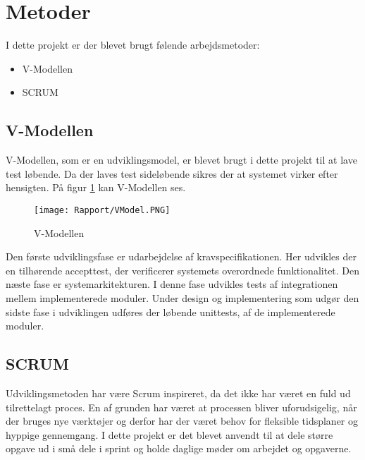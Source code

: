 \section{Metoder}

I dette projekt er der blevet brugt følende arbejdsmetoder:
\begin{itemize}
	\item V-Modellen
	\item SCRUM
	
\end{itemize}

\subsection{V-Modellen}

V-Modellen, som er en udviklingsmodel, er blevet brugt i dette projekt til at lave test løbende. Da der laves test sideløbende sikres der at systemet virker efter hensigten. På figur \ref{VModel} kan V-Modellen ses.

\begin{figure}[H]
	\centering
	\texttt{[image: Rapport/VModel.PNG]}
	\caption{V-Modellen}
	\label{VModel}
\end{figure} 
Den første udviklingsfase er udarbejdelse af kravspecifikationen. Her udvikles der en tilhørende accepttest, der verificerer systemets overordnede funktionalitet. Den næste fase er systemarkitekturen.
I denne fase udvikles tests af integrationen mellem implementerede moduler. Under design og implementering som udgør den sidste fase i udviklingen udføres der løbende unittests, af de implementerede moduler.

\subsection{SCRUM}
Udviklingsmetoden har være Scrum inspireret, da det ikke har været en fuld ud tilrettelagt proces. En af grunden har været at processen bliver uforudsigelig, når der bruges nye værktøjer og derfor har der været behov for fleksible tidsplaner og hyppige gennemgang. 
\newline
\newline
I dette projekt er det blevet anvendt til at dele større opgave ud i små dele i sprint og holde daglige møder om arbejdet og opgaverne. 


